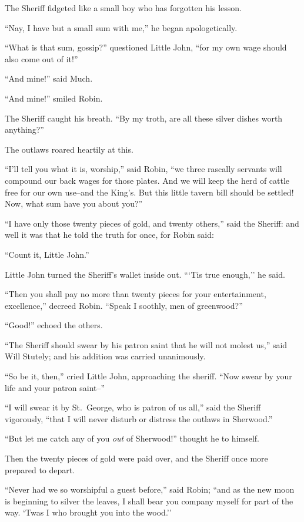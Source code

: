 The Sheriff fidgeted like a small boy who has forgotten his lesson.

``Nay, I have but a small sum with me,'' he began apologetically.

``What is that sum, gossip?'' questioned Little John, ``for my own wage
should also come out of it!''

``And mine!'' said Much.

``And mine!'' smiled Robin.

The Sheriff caught his breath. ``By my troth, are all these silver
dishes worth anything?''

The outlaws roared heartily at this.

``I'll tell you what it is, worship,'' said Robin, ``we three rascally
servants will compound our back wages for those plates. And we will keep
the herd of cattle free for our own use--and the King's. But this little
tavern bill should be settled! Now, what sum have you about you?''

``I have only those twenty pieces of gold, and twenty others,'' said the
Sheriff: and well it was that he told the truth for once, for Robin
said:

``Count it, Little John.''

Little John turned the Sheriff's wallet inside out. ```Tis true
enough,'' he said.

``Then you shall pay no more than twenty pieces for your entertainment,
excellence,'' decreed Robin. ``Speak I soothly, men of greenwood?''

``Good!'' echoed the others.

``The Sheriff should swear by his patron saint that he will not molest
us,'' said Will Stutely; and his addition was carried unanimously.

``So be it, then,'' cried Little John, approaching the sheriff. ``Now
swear by your life and your patron saint--''

``I will swear it by St.~George, who is patron of us all,'' said the
Sheriff vigorously, ``that I will never disturb or distress the outlaws
in Sherwood.''

``But let me catch any of you \emph{out} of Sherwood!'' thought he to
himself.

Then the twenty pieces of gold were paid over, and the Sheriff once more
prepared to depart.

``Never had we so worshipful a guest before,'' said Robin; ``and as the
new moon is beginning to silver the leaves, I shall bear you company
myself for part of the way. `Twas I who brought you into the wood.''

